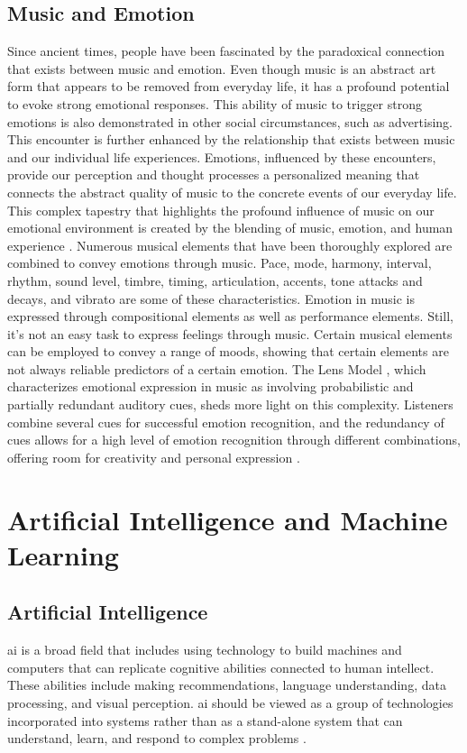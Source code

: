 \subsection{Music and Emotion}
Since ancient times, people have been fascinated by the paradoxical connection that exists between music and emotion.
Even though music is an abstract art form that appears to be removed from everyday life, it has a profound potential to evoke strong emotional responses.
This ability of music to trigger strong emotions is also demonstrated in other social circumstances, such as advertising. 
This encounter is further enhanced by the relationship that exists between music and our individual life experiences.
Emotions, influenced by these encounters, provide our perception and thought processes a personalized meaning that connects the abstract quality of music to the concrete events of our everyday life. 
This complex tapestry that highlights the profound influence of music on our emotional environment is created by the blending of music, emotion, and human experience \citep{juslin_2013_music}.
\newpage
\indent Numerous musical elements that have been thoroughly explored are combined to convey emotions through music. 
Pace, mode, harmony, interval, rhythm, sound level, timbre, timing, articulation, accents, tone attacks and decays, and vibrato are some of these characteristics. 
Emotion in music is expressed through compositional elements as well as performance elements. 
Still, it's not an easy task to express feelings through music. 
Certain musical elements can be employed to convey a range of moods, showing that certain elements are not always reliable predictors of a certain emotion. 
The Lens Model \citep{juslin_2013_music}, which characterizes emotional expression in music as involving probabilistic and partially redundant auditory cues, sheds more light on this complexity.
Listeners combine several cues for successful emotion recognition, and the redundancy of cues allows for a high level of emotion recognition through different combinations, offering room for creativity and personal expression \citep{pereira_2011_music}.
\\
\section{Artificial Intelligence and Machine Learning}
\subsection{Artificial Intelligence}
\gls{ai} is a broad field that includes using technology to build machines and computers that can replicate cognitive abilities connected to human intellect. 
These abilities include making recommendations, language understanding, data processing, and visual perception.
\gls{ai} should be viewed as a group of technologies incorporated into systems rather than as a stand-alone system that can understand, learn, and respond to complex problems \citep{google_2023_what}.

